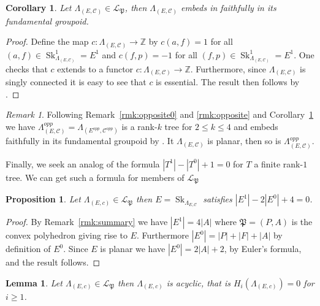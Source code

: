 \documentclass[12pt]{amsart}
\newtheorem{cor}[thm]{Corollary}
\newtheorem{lem}[thm]{Lemma}
\newtheorem{prop}[thm]{Proposition}
\theoremstyle{definition}
\theoremstyle{remark}
\newtheorem{rmk}[thm]{Remark}
\numberwithin{equation}{section}
\newcommand{\ZZ}{\mathbb{Z}}
\newcommand{\Cc}{\mathcal{C}}
\newcommand{\Sk}{\operatorname{Sk}}
\begin{document}
\begin{cor} \label{cor:pthrg-embedd}
Let $\Lambda_{(E,\Cc)} \in \mathcal{L}_{\mathfrak{P}}$, then $\Lambda_{(E,\Cc)}$ embeds in faithfully in its fundamental groupoid.
\end{cor}

\begin{proof}
Define the map $c: \Lambda_{(E,\Cc)} \to \ZZ$ by $c ( a , f ) = 1$ for all $(a,f) \in \Sk_{\Lambda_{(E,\Cc)}}^1=E^1$ and $c ( f , p ) = -1$ for all $(f,p) \in  \Sk_{\Lambda_{(E,\Cc)}}^1=E^1$. One checks that $c$ extends to a functor $c: \Lambda_{(E,\Cc)} \to \ZZ$. Furthermore, since $\Lambda_{(E,\Cc)}$ is singly connected it is easy to see that $c$ is essential. The result then follows by \cite[Proposition~3.12]{bkps}.
\end{proof}

\begin{rmk}
Following Remark~\ref{rmk:opposite0} and \ref{rmk:opposite} and Corollary~\ref{cor:pthrg-embedd} we have $\Lambda_{(E,\Cc)}^{opp} = \Lambda_{(E^{opp},\Cc^{opp})}$ is a rank-$k$ tree for $2 \le k \le 4$ and embeds faithfully in its fundamental groupoid by \cite[Proposition~3.12]{bkps}. It $\Lambda_{(E,\Cc)}$ is planar, then so is
$\Lambda_{(E,\Cc)}^{opp}$.
\end{rmk}

\noindent
Finally, we seek an analog of the formula $| T^1 | - | T^0| +1 =0$ for $T$ a finite rank-$1$ tree. We can get such a formula for members of $\mathcal{L}_{\mathfrak{P}}$


   
\begin{prop}  \label{prp:Lambek_Euler}
Let $\Lambda_{(E,c)} \in \mathcal{L}_{\mathfrak{P}}$ then  $E = \Sk_{\Lambda_{E,\mathcal{C}}}$ satisfies $|E^1 | - 2 | E^0 |  +4 =0$.
\end{prop}

\begin{proof}
By Remark~\ref{rmk:summary} we have $| E^1 | =4 |A|$ where $\mathfrak{P} = (P,A)$ is the convex polyhedron giving rise to $E$. Furthermore $|E^0| = |P|+|F|+|A|$ by definition of $E^0$. Since $E$ is planar we have $|E^0| = 2|A|+2$, by Euler's formula, and the result follows.
\end{proof}


\begin{lem} \label{lem:acyclic}
Let $\Lambda_{(E,c)} \in \mathcal{L}_{\mathfrak{P}}$ then $\Lambda_{(E,c)}$ is acyclic, that is $H_i ( \Lambda_{(E,c)}  ) = 0$ for $i \ge 1$.
\end{lem}
\end{document}
